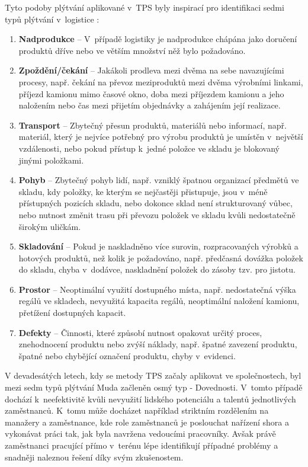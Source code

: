 Tyto podoby plýtvání aplikované v~TPS byly inspirací pro identifikaci sedmi typů plýtvání v~logistice \cite{bib:seven, bib:Jirsak}:
\begin{enumerate}
    \item \textbf{Nadprodukce} -- V~případě logistiky je nadprodukce chápána jako doručení produktů dříve nebo ve větším množství něž bylo požadováno.
    \item \textbf{Zpoždění/čekání} -- Jakákoli prodleva mezi dvěma na sebe navazujícími procesy, např. čekání na převoz meziproduktů mezi dvěma výrobními linkami, příjezd kamionu mimo časové okno, doba mezi příjezdem kamionu a jeho naložením nebo čas mezi přijetím objednávky a zahájením její realizace. 
    \item \textbf{Transport} -- Zbytečný přesun produktů, materiálů nebo informací, např. materiál, který je nejvíce potřebný pro výrobu produktů je umístěn v~největší vzdálenosti, nebo pokud přístup k~jedné položce ve skladu je blokovaný jinými položkami.
    \item \textbf{Pohyb} -- Zbytečný pohyb lidí, např. vzniklý špatnou organizací předmětů ve skladu, kdy položky, ke kterým se nejčastěji přistupuje, jsou v~méně přístupných pozicích skladu, nebo dokonce sklad není strukturovaný vůbec, nebo nutnost změnit trasu při převozu položek ve skladu kvůli nedostatečně širokým uličkám.
    \item \textbf{Skladování} -- Pokud je naskladněno více surovin, rozpracovaných výrobků a hotových produktů, než kolik je požadováno, např. předčasná dovážka položek do skladu, chyba v~dodávce, naskladnění položek do zásoby tzv. pro jistotu.
    \item \textbf{Prostor} -- Neoptimální využití dostupného místa, např. nedostatečná výška regálů ve skladech, nevyužitá kapacita regálů, neoptimální naložení kamionu, přetížení dostupných kapacit.
    \item \textbf{Defekty} -- Činnosti, které způsobí nutnost opakovat určitý proces, znehodnocení produktu nebo zvýší náklady, např. špatné zavezení produktu, špatné nebo chybějící označení produktu, chyby v~evidenci.
\end{enumerate}

V devadesátých letech, kdy se metody TPS začaly aplikovat ve společnostech, byl mezi sedm typů plýtvání Muda začleněn osmý typ - Dovednosti. V~tomto případě dochází k~neefektivitě kvůli nevyužití lidského potenciálu a talentů jednotlivých zaměstnanců. K~tomu může docházet například striktním rozdělením na manažery a zaměstnance, kde role zaměstnanců je poslouchat nařízení shora a vykonávat práci tak, jak byla navržena vedoucími pracovníky. Avšak právě zaměstnanci pracující přímo v~terénu lépe identifikují případné problémy a snadněji naleznou řešení díky svým zkušenostem.\cite{bib:LW1}


